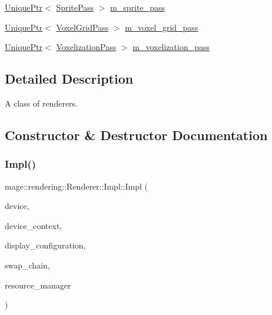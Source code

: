 \begin{DoxyCompactItemize}
\item 
\mbox{\hyperlink{namespacemage_a3316d7143a973e37adf1110f2e80ca31}{Unique\+Ptr}}$<$ \mbox{\hyperlink{classmage_1_1rendering_1_1_sprite_pass}{Sprite\+Pass}} $>$ \mbox{\hyperlink{classmage_1_1rendering_1_1_renderer_1_1_impl_a38a33ead382177e950db18795601723a}{m\+\_\+sprite\+\_\+pass}}
\item 
\mbox{\hyperlink{namespacemage_a3316d7143a973e37adf1110f2e80ca31}{Unique\+Ptr}}$<$ \mbox{\hyperlink{classmage_1_1rendering_1_1_voxel_grid_pass}{Voxel\+Grid\+Pass}} $>$ \mbox{\hyperlink{classmage_1_1rendering_1_1_renderer_1_1_impl_ad0b4ff740d36e1723949213ab5ba74bc}{m\+\_\+voxel\+\_\+grid\+\_\+pass}}
\item 
\mbox{\hyperlink{namespacemage_a3316d7143a973e37adf1110f2e80ca31}{Unique\+Ptr}}$<$ \mbox{\hyperlink{classmage_1_1rendering_1_1_voxelization_pass}{Voxelization\+Pass}} $>$ \mbox{\hyperlink{classmage_1_1rendering_1_1_renderer_1_1_impl_a1701b11fe9fe100a033920b6e8617adb}{m\+\_\+voxelization\+\_\+pass}}
\end{DoxyCompactItemize}


\subsection{Detailed Description}
A class of renderers. 

\subsection{Constructor \& Destructor Documentation}
\mbox{\label{classmage_1_1rendering_1_1_renderer_1_1_impl_a51ee7e924709bda3d53e73e21352849c}} 
\subsubsection{\texorpdfstring{Impl()}{Impl()}\hspace{0.1cm}{\footnotesize\ttfamily [1/3]}}
{\footnotesize\ttfamily mage\+::rendering\+::\+Renderer\+::\+Impl\+::\+Impl (\begin{DoxyParamCaption}\item[{I\+D3\+D11\+Device \&}]{device,  }\item[{I\+D3\+D11\+Device\+Context \&}]{device\+\_\+context,  }\item[{\mbox{\hyperlink{classmage_1_1rendering_1_1_display_configuration}{Display\+Configuration}} \&}]{display\+\_\+configuration,  }\item[{\mbox{\hyperlink{classmage_1_1rendering_1_1_swap_chain}{Swap\+Chain}} \&}]{swap\+\_\+chain,  }\item[{\mbox{\hyperlink{classmage_1_1rendering_1_1_resource_manager}{Resource\+Manager}} \&}]{resource\+\_\+manager }\end{DoxyParamCaption})\hspace{0.3cm}{\ttfamily [explicit]}}

